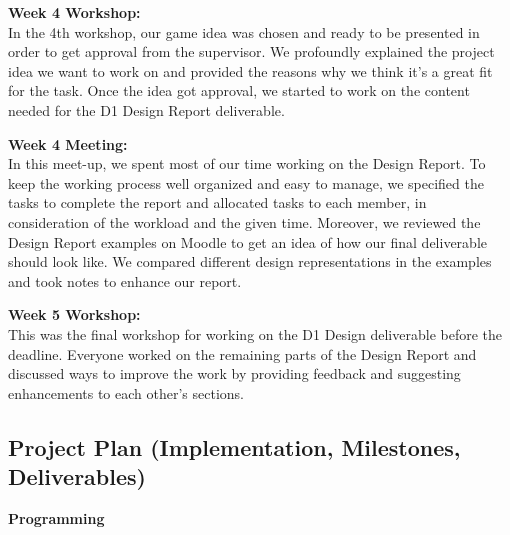 \documentclass[12pt]{article}
\begin{document}
\noindent\textbf{Week 4 Workshop:}\\
In the 4th workshop, our game idea was chosen and ready to be presented in order to get approval from the supervisor. We profoundly explained the project idea we want to work on and provided the reasons why we think it’s a great fit for the task. Once the idea got approval, we started to work on the content needed for the D1 Design Report deliverable.

\noindent\textbf{Week 4 Meeting:}\\
In this meet-up, we spent most of our time working on the Design Report. To keep the working process well organized and easy to manage, we specified the tasks to complete the report and allocated tasks to each member, in consideration of the workload and the given time. Moreover, we reviewed the Design Report examples on Moodle to get an idea of how our final deliverable should look like. We compared different design representations in the examples and took notes to enhance our report.

\noindent\textbf{Week 5 Workshop:}\\
This was the final workshop for working on the D1 Design deliverable before the deadline. Everyone worked on the remaining parts of the Design Report and discussed ways to improve the work by providing feedback and suggesting enhancements to each other’s sections.

\subsection{Project Plan (Implementation, Milestones, Deliverables)}


\noindent\textbf{Programming}

\setlength{\LTpre}{6pt}
\setlength{\LTpost}{6pt}

\begingroup
\setlength{\parindent}{0pt}

\setlength{\widenby}{45mm} %

\setlength{\LTleft}{-0.5\widenby}
\setlength{\LTright}{-0.5\widenby}
\end{document}

